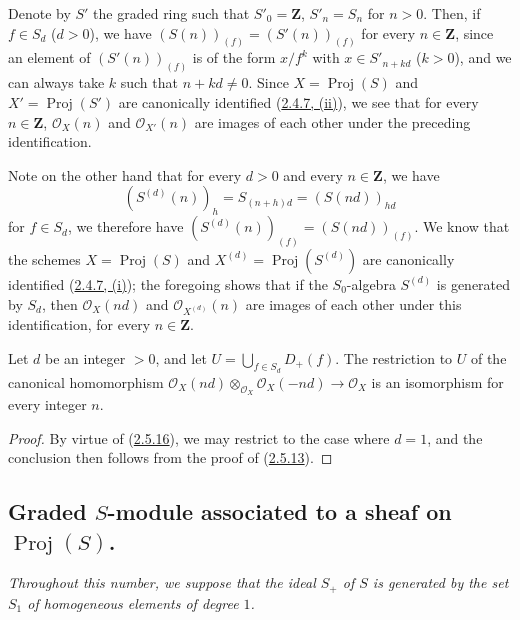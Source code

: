 \begin{env}[2.5.16]
\label{II.2.5.16}
Denote by $S'$ the graded ring such that $S'_0=\mathbf{Z}$,
$S'_n=S_n$ for $n>0$. Then, if $f\in S_d$ ($d>0$), we have
$(S(n))_{(f)}=(S'(n))_{(f)}$ for every $n\in\mathbf{Z}$, since an element of
$(S'(n))_{(f)}$ is of the form $x/f^k$ with $x\in S'_{n+kd}$ ($k>0$), and
we can always take $k$ such that $n+kd\neq0$. Since
$X=\operatorname{Proj}(S)$ and $X'=\operatorname{Proj}(S')$ are
canonically identified (\hyperref[II.2.4.7]{2.4.7, (ii)}), we see that for
every $n\in\mathbf{Z}$, $\mathcal{O}_X(n)$ and $\mathcal{O}_{X'}(n)$ are
images of each other under the preceding identification.

Note on the other hand that for every $d>0$ and every $n\in\mathbf{Z}$, we
have
\[
  (S^{(d)}(n))_h=S_{(n+h)d}=(S(nd))_{hd}
\]
for $f\in S_d$, we therefore have $(S^{(d)}(n))_{(f)}=(S(nd))_{(f)}$. We
know that the schemes $X=\operatorname{Proj}(S)$ and
$X^{(d)}=\operatorname{Proj}(S^{(d)})$ are canonically identified
(\hyperref[II.2.4.7]{2.4.7, (i)}); the foregoing shows that if the
$S_0$-algebra $S^{(d)}$ is generated by $S_d$, then $\mathcal{O}_X(nd)$ and
$\mathcal{O}_{X^{(d)}}(n)$ are images of each other under this
identification, for every $n\in\mathbf{Z}$.
\end{env}

\begin{proposition}[2.5.17]
\label{II.2.5.17}
Let $d$ be an integer $>0$, and let
$U=\bigcup_{f\in S_d}D_+(f)$. The restriction to $U$ of the canonical
homomorphism
$\mathcal{O}_X(nd)\otimes_{\mathcal{O}_X}\mathcal{O}_X(-nd)
\to\mathcal{O}_X$ is an isomorphism for every integer $n$.
\end{proposition}

\begin{proof}
By virtue of (\hyperref[II.2.5.16]{2.5.16}), we may restrict to the case
where $d=1$, and the conclusion then follows from the proof of
(\hyperref[II.2.5.13]{2.5.13}).
\end{proof}

\subsection{Graded $S$-module associated to a sheaf on
$\operatorname{Proj}(S)$.}
\label{subsection:II.2.6}

\emph{Throughout this number, we suppose that the ideal $S_+$ of $S$ is
generated by the set $S_1$ of homogeneous elements of degree $1$.}

